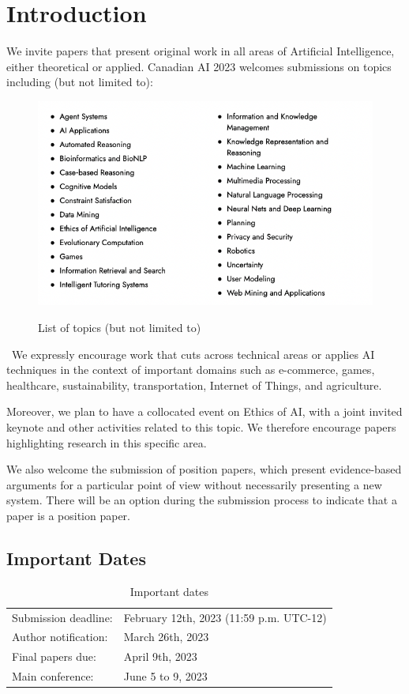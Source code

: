 \documentclass[10pt]{cai}
\begin{document}
\section{Introduction}
\label{intro}
We invite papers that present original work in all areas of Artificial Intelligence, either theoretical or applied. Canadian AI 2023 welcomes submissions on topics including (but not limited to):
\begin{figure}[H]
    \centering
    \includegraphics[scale=0.6]{figs/sample_fig.png} \\
    \caption{List of topics (but not limited to)}
    \label{fig:sample_fig}
\end{figure}
\
We expressly encourage work that cuts across technical areas or applies AI techniques in the context of important domains such as e-commerce, games, healthcare, sustainability,  transportation, Internet of Things, and agriculture.

Moreover, we plan to have a collocated event on Ethics of AI, with a joint invited keynote and other activities related to this topic. We therefore encourage papers highlighting research in this specific area.

We also welcome the submission of position papers, which present evidence-based arguments for a particular point of view without necessarily presenting a new system. There will be an option during the submission process to indicate that a paper is a position paper.

\subsection{Important Dates}
\label{important}

\begin{table}[h]
\begin{tabular}{ |l|l| }
 Submission deadline: & February 12th, 2023 (11:59 p.m. UTC-12) \\ 
 Author notification: & March 26th, 2023 \\  
 Final papers due: & April 9th, 2023 \\
 Main conference: & June 5 to 9, 2023
\end{tabular}
\vspace{0.2cm}
\caption{Important dates}
\label{tab:important}
\end{table}
\end{document}
